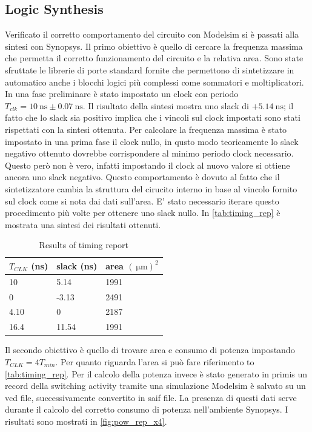 \subsection{Logic Synthesis}
Verificato il corretto comportamento del circuito con Modelsim si è passati alla sintesi con Synopsys. Il primo obiettivo è quello di cercare la frequenza massima che permetta il corretto funzionamento del circuito e la relativa area. Sono state sfruttate le librerie di porte standard fornite che permettono di sintetizzare in automatico anche i blocchi logici più complessi come sommatori e moltiplicatori.
In una fase preliminare è stato impostato un clock con periodo $T_{clk} = \SI{10}{\nano\second} \pm \SI{0.07}{\nano\second}$. Il risultato della sintesi mostra uno slack di $+\SI{5.14}{\nano\second}$; il fatto che lo slack sia positivo implica che i vincoli sul clock impostati sono stati rispettati con la sintesi ottenuta.
Per calcolare la frequenza massima è stato impostato in una prima fase il clock nullo, in qusto modo teoricamente lo slack negativo ottenuto dovrebbe corrispondere al minimo periodo clock necessario. Questo però non è vero, infatti impostando il clock al nuovo valore si ottiene ancora uno slack negativo. Questo comportamento è dovuto al fatto che il sintetizzatore cambia la struttura del cirucito interno in base al vincolo fornito sul clock come si nota dai dati sull'area. E' stato necessario iterare questo procedimento più volte per ottenere uno slack nullo. In \autoref{tab:timing_rep} è mostrata una sintesi dei risultati ottenuti.

\begin{table}[h]
\begin{center}
\begin{tabular}{|l|l|l|}
\hline
$T_{CLK}$ (ns) & slack (ns) & area $(\SI{}{\micro\meter})^2$ \\
\hline
10 & 5.14 & 1991 \\
0 & -3.13 & 2491 \\
4.10 & 0 & 2187 \\
16.4 & 11.54 & 1991 \\
\hline
\end{tabular}
\end{center}
\caption{Results of timing report}
\label{tab:timing_rep}
\end{table}

Il secondo obiettivo è quello di trovare area e consumo di potenza impostando $T_{CLK} = 4 T_{min}$. Per quanto riguarda l'area si può fare riferimento to \autoref{tab:timing_rep}. Per il calcolo della potenza invece è stato generato in primis un record della switching activity tramite una simulazione Modelsim è salvato su un vcd file, successivamente convertito in saif file. La presenza di questi dati serve durante il calcolo del corretto consumo di potenza nell'ambiente Synopsys. I risultati sono mostrati in \autoref{fig:pow_rep_x4}.

